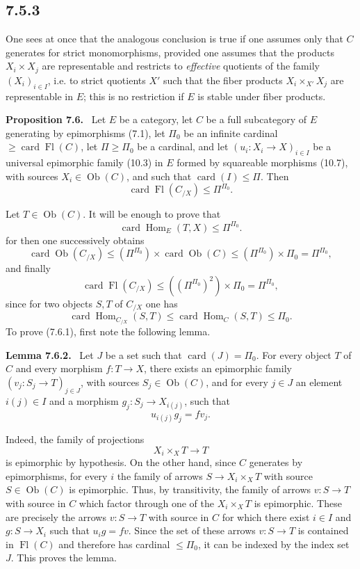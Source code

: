 \documentclass[11pt]{article}
\newcommand{\Ob}{\operatorname{Ob}}
\newcommand{\Hom}{\operatorname{Hom}}
\newcommand{\Fl}{\operatorname{Fl}}
\newcommand{\card}{\operatorname{card}}
\newenvironment{statement}[1]{\par\medskip\noindent\textbf{#1.}\ }{\par\medskip}
\begin{document}
\subsection*{7.5.3}
One sees at once that the analogous conclusion is true if one assumes only that $C$ generates for strict monomorphisms, provided one assumes that the products $X_i\times X_j$ are representable and restricts to \emph{effective} quotients of the family $(X_i)_{i\in I}$, i.e. to strict quotients $X'$ such that the fiber products $X_i\times_{X'}X_j$ are representable in $E$; this is no restriction if $E$ is stable under fiber products.

\begin{statement}{Proposition 7.6}
Let $E$ be a category, let $C$ be a full subcategory of $E$ generating by epimorphisms (7.1), let $\Pi_0$ be an infinite cardinal $\geq\card\Fl(C)$, let $\Pi\geq\Pi_0$ be a cardinal, and let $(u_i:X_i\to X)_{i\in I}$ be a universal epimorphic family (10.3) in $E$ formed by squareable morphisms (10.7), with sources $X_i\in\Ob(C)$, and such that $\card(I)\leq\Pi$. Then
\[
\card\Fl(C_{/X})\leq \Pi^{\Pi_0}.
\]
\end{statement}

Let $T\in\Ob(C)$. It will be enough to prove that
\begin{equation*}
\card\Hom_E(T,X)\leq\Pi^{\Pi_0}.\tag{7.6.1}
\end{equation*}
for then one successively obtains
\[
\card\Ob(C_{/X})\leq (\Pi^{\Pi_0})\times\card\Ob(C)\leq (\Pi^{\Pi_0})\times\Pi_0=\Pi^{\Pi_0},
\]
and finally
\[
\card\Fl(C_{/X})\leq ((\Pi^{\Pi_0})^2)\times\Pi_0=\Pi^{\Pi_0},
\]
since for two objects $S,T$ of $C_{/X}$ one has
\[
\card\Hom_{C_{/X}}(S,T)\leq\card\Hom_C(S,T)\leq\Pi_0.
\]
To prove (7.6.1), first note the following lemma.

\begin{statement}{Lemma 7.6.2}
Let $J$ be a set such that $\card(J)=\Pi_0$. For every object $T$ of $C$ and every morphism $f:T\to X$, there exists an epimorphic family $(v_j:S_j\to T)_{j\in J}$, with sources $S_j\in\Ob(C)$, and for every $j\in J$ an element $i(j)\in I$ and a morphism $g_j:S_j\to X_{i(j)}$, such that
\[
u_{i(j)}g_j=fv_j.
\]
\end{statement}

Indeed, the family of projections
\[
X_i\times_XT\longrightarrow T
\]
is epimorphic by hypothesis. On the other hand, since $C$ generates by epimorphisms, for every $i$ the family of arrows $S\to X_i\times_XT$ with source $S\in\Ob(C)$ is epimorphic. Thus, by transitivity, the family of arrows $v:S\to T$ with source in $C$ which factor through one of the $X_i\times_XT$ is epimorphic. These are precisely the arrows $v:S\to T$ with source in $C$ for which there exist $i\in I$ and $g:S\to X_i$ such that $u_ig=fv$. Since the set of these arrows $v:S\to T$ is contained in $\Fl(C)$ and therefore has cardinal $\leq\Pi_0$, it can be indexed by the index set $J$. This proves the lemma.
\end{document}
